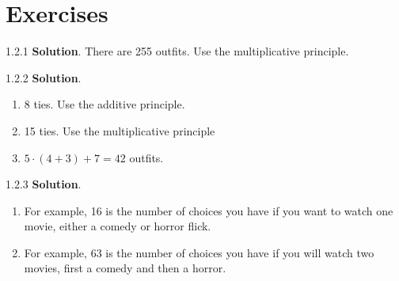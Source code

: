 \documentclass[11pt,]{book}
\theoremstyle{ptxplainnotitle}
\theoremstyle{ptxplaintitle}
\theoremstyle{ptxdefinitionnotitle}
\theoremstyle{ptxdefinitiontitle}
\theoremstyle{ptxdefinitionnotitle}
\theoremstyle{ptxdefinitiontitle}
\theoremstyle{ptxdefinitionnotitle}
\theoremstyle{ptxdefinitiontitle}
\theoremstyle{ptxdefinitiontitlenonumber}
\theoremstyle{ptxdefinitiontitlenonumber}
\numberwithin{equation}{chapter}
\begin{document}
\section*{Exercises}
\begin{divisionexercise}{1.2.1}
\textbf{Solution}.\quad%
\hypertarget{p-1106}{}%
There are 255 outfits. Use the multiplicative principle.%
\end{divisionexercise}%
\begin{divisionexercise}{1.2.2}
\textbf{Solution}.\quad%
\hypertarget{p-1123}{}%
\leavevmode%
\begin{enumerate}[label=\alph*.]
\item\hypertarget{li-478}{}\hypertarget{p-1124}{}%
8 ties.  Use the additive principle.%
\item\hypertarget{li-479}{}\hypertarget{p-1125}{}%
15 ties. Use the multiplicative principle%
\item\hypertarget{li-480}{}\hypertarget{p-1126}{}%
\(5\cdot (4+3) + 7 = 42\) outfits.%
\end{enumerate}
%
\end{divisionexercise}%
\begin{divisionexercise}{1.2.3}
\textbf{Solution}.\quad%
\hypertarget{p-1130}{}%
\leavevmode%
\begin{enumerate}[label=(\alph*)]
\item\hypertarget{li-483}{}\hypertarget{p-1131}{}%
For example, 16 is the number of choices you have if you want to watch one movie, either a comedy or horror flick.%
\item\hypertarget{li-484}{}\hypertarget{p-1132}{}%
For example, 63 is the number of choices you have if you will watch two movies, first a comedy and then a horror.%
\end{enumerate}
%
\end{divisionexercise}%
\end{document}
